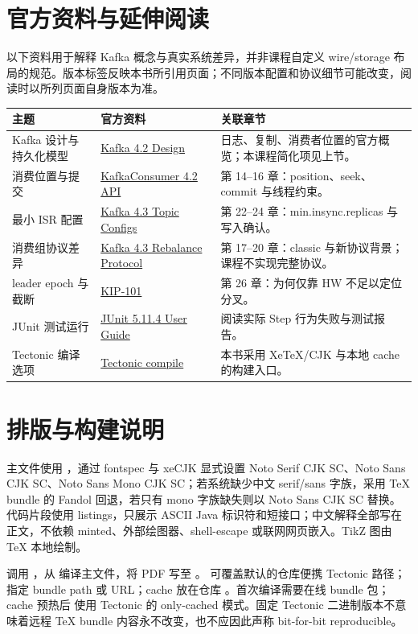 \section{官方资料与延伸阅读}
以下资料用于解释 Kafka 概念与真实系统差异，并非课程自定义 wire/storage 布局的规范。版本标签反映本书所引用页面；不同版本配置和协议细节可能改变，阅读时以所列页面自身版本为准。
\begin{longtable}{p{}p{}p{}}
\toprule
主题 & 官方资料 & 关联章节 \\
\midrule
\endhead
Kafka 设计与持久化模型 & \href{https://kafka.apache.org/42/design/design/}{Kafka 4.2 Design} & 日志、复制、消费者位置的官方概览；本课程简化项见上节。\\
消费位置与提交 & \href{https://kafka.apache.org/42/javadoc/org/apache/kafka/clients/consumer/KafkaConsumer.html}{KafkaConsumer 4.2 API} & 第 14–16 章：position、seek、commit 与线程约束。\\
最小 ISR 配置 & \href{https://kafka.apache.org/43/configuration/topic-configs/}{Kafka 4.3 Topic Configs} & 第 22–24 章：min.insync.replicas 与写入确认。\\
消费组协议差异 & \href{https://kafka.apache.org/43/operations/consumer-rebalance-protocol/}{Kafka 4.3 Rebalance Protocol} & 第 17–20 章：classic 与新协议背景；课程不实现完整协议。\\
leader epoch 与截断 & \href{https://cwiki.apache.org/confluence/display/KAFKA/KIP-101+-+Alter+Replication+Protocol+to+use+Leader+Epoch+rather+than+High+Watermark+for+Truncation}{KIP-101} & 第 26 章：为何仅靠 HW 不足以定位分叉。\\
JUnit 测试运行 & \href{https://docs.junit.org/5.11.4/user-guide/}{JUnit 5.11.4 User Guide} & 阅读实际 Step 行为失败与测试报告。\\
Tectonic 编译选项 & \href{https://tectonic-typesetting.github.io/book/latest/v2cli/compile.html}{Tectonic compile} & 本书采用 XeTeX/CJK 与本地 cache 的构建入口。\\
\bottomrule
\end{longtable}

\section{排版与构建说明}
主文件使用 ，通过 fontspec 与 xeCJK 显式设置 Noto Serif CJK SC、Noto Sans CJK SC、Noto Sans Mono CJK SC；若系统缺少中文 serif/sans 字族，采用 TeX bundle 的 Fandol 回退，若只有 mono 字族缺失则以 Noto Sans CJK SC 替换。代码片段使用 listings，只展示 ASCII Java 标识符和短接口；中文解释全部写在正文，不依赖 minted、外部绘图器、shell-escape 或联网网页嵌入。TikZ 图由 TeX 本地绘制。

 调用 ，从  编译主文件，将 PDF 写至 。 可覆盖默认的仓库便携 Tectonic 路径； 指定 bundle path 或 URL；cache 放在仓库 。首次编译需要在线 bundle 包；cache 预热后  使用 Tectonic 的 only-cached 模式。固定 Tectonic 二进制版本不意味着远程 TeX bundle 内容永不改变，也不应因此声称 bit-for-bit reproducible。